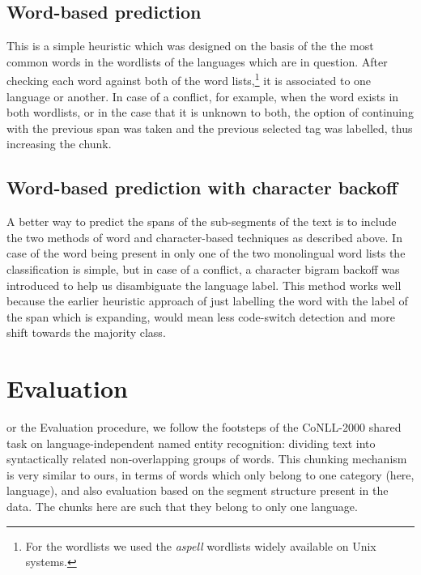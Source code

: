 \documentclass[11pt]{article}
\begin{document}
\subsection{Word-based prediction}
\label{wbased}

This is a simple heuristic which was designed on the basis of the the most common words in the wordlists of the languages 
which are in question. After checking each word against both of the word lists,\footnote{For the wordlists we used the \emph{aspell}
wordlists widely available on Unix systems.} it is associated to one language or another. In 
case of a conflict, for example, when the word exists in both wordlists, or in the case that it is unknown to both, the option 
of continuing with the previous span was taken and the previous selected tag was labelled, thus increasing the chunk. 

\subsection{Word-based prediction with character backoff}
\label{wbasedbackoff}

A better way to predict the spans of the sub-segments of the text is to include the two methods of word and character-based techniques 
as described above. In case of the word being present in only one of the two monolingual word lists the classification is simple, 
but in case of a conflict, a character bigram backoff was introduced to help us disambiguate the language label. This method works well because the earlier heuristic approach of just labelling the word with the label of the span which is expanding, would mean less code-switch detection and more shift towards the majority class. 




%
%

\section{Evaluation}
\label{sec:eval}

or the Evaluation procedure, we follow the footsteps of the CoNLL-2000 shared task on language-independent 
named entity recognition: dividing text into syntactically related non-overlapping groups of words. This 
chunking mechanism \cite{tjong2003introduction} is very similar to ours, in terms of words which only belong to 
one category (here, language), and also evaluation based on the segment structure present in the data. The chunks 
here are such that they belong to only one language. 
\end{document}
